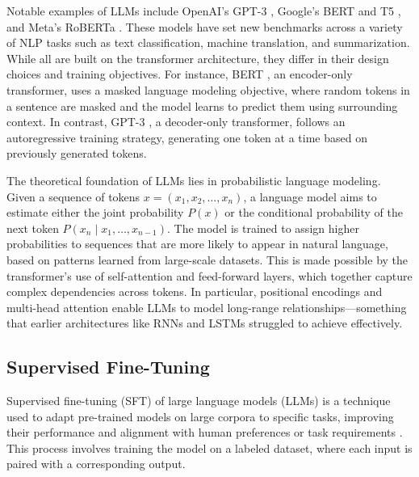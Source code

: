 Notable examples of LLMs include OpenAI's GPT-3 \citep{gpt3Paper}, Google's BERT \citep{bertPaper} and T5 \citep{t5GooglePaper}, and Meta's RoBERTa \citep{robertaPaper}. These models have set new benchmarks across a variety of NLP tasks such as text classification, machine translation, and summarization. While all are built on the transformer architecture, they differ in their design choices and training objectives. For instance, BERT \citep{bertPaper}, an encoder-only transformer, uses a masked language modeling objective, where random tokens in a sentence are masked and the model learns to predict them using surrounding context. In contrast, GPT-3 \citep{gpt3Paper}, a decoder-only transformer, follows an autoregressive training strategy, generating one token at a time based on previously generated tokens.

The theoretical foundation of LLMs lies in probabilistic language modeling. Given a sequence of tokens \( x = (x_1, x_2, \dots, x_n) \), a language model aims to estimate either the joint probability \( P(x) \) or the conditional probability of the next token \( P(x_n \mid x_1, \dots, x_{n-1}) \). The model is trained to assign higher probabilities to sequences that are more likely to appear in natural language, based on patterns learned from large-scale datasets. This is made possible by the transformer's use of self-attention and feed-forward layers, which together capture complex dependencies across tokens. In particular, positional encodings and multi-head attention enable LLMs to model long-range relationships—something that earlier architectures like RNNs and LSTMs struggled to achieve effectively.



\subsection{Supervised Fine-Tuning}

Supervised fine-tuning (SFT) of large language models (LLMs) is a technique used to adapt pre-trained models on large corpora to specific tasks, improving their performance and alignment with human preferences or task requirements \citep{Wang2023AligningLargeLanguageModels}. This process involves training the model on a labeled dataset, where each input is paired with a corresponding output.

